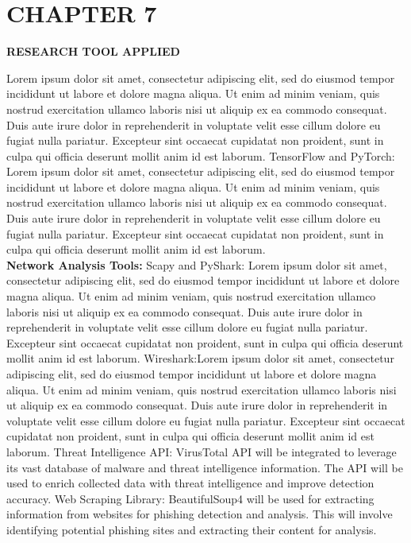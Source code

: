 \documentclass[12pt]{article}
\newcommand{\centersection}[1]{%
  \begin{center}
    \fontfamily{ptm}\fontsize{14}{16}\selectfont\bfseries\uppercase{#1}
  \end{center}
}
\begin{document}
\section*{CHAPTER 7}
\centersection{RESEARCH TOOL APPLIED}
\fontsize{12}{14}\selectfont
Lorem ipsum dolor sit amet, consectetur adipiscing elit, sed do eiusmod tempor incididunt ut labore et dolore magna aliqua. Ut enim ad minim veniam, quis nostrud exercitation ullamco laboris nisi ut aliquip ex ea commodo consequat. Duis aute irure dolor in reprehenderit in voluptate velit esse cillum dolore eu fugiat nulla pariatur. Excepteur sint occaecat cupidatat non proident, sunt in culpa qui officia deserunt mollit anim id est laborum.
TensorFlow and PyTorch: Lorem ipsum dolor sit amet, consectetur adipiscing elit, sed do eiusmod tempor incididunt ut labore et dolore magna aliqua. Ut enim ad minim veniam, quis nostrud exercitation ullamco laboris nisi ut aliquip ex ea commodo consequat. Duis aute irure dolor in reprehenderit in voluptate velit esse cillum dolore eu fugiat nulla pariatur. Excepteur sint occaecat cupidatat non proident, sunt in culpa qui officia deserunt mollit anim id est laborum.\\
\textbf{Network Analysis Tools:}
Scapy and PyShark: Lorem ipsum dolor sit amet, consectetur adipiscing elit, sed do eiusmod tempor incididunt ut labore et dolore magna aliqua. Ut enim ad minim veniam, quis nostrud exercitation ullamco laboris nisi ut aliquip ex ea commodo consequat. Duis aute irure dolor in reprehenderit in voluptate velit esse cillum dolore eu fugiat nulla pariatur. Excepteur sint occaecat cupidatat non proident, sunt in culpa qui officia deserunt mollit anim id est laborum.
Wireshark:Lorem ipsum dolor sit amet, consectetur adipiscing elit, sed do eiusmod tempor incididunt ut labore et dolore magna aliqua. Ut enim ad minim veniam, quis nostrud exercitation ullamco laboris nisi ut aliquip ex ea commodo consequat. Duis aute irure dolor in reprehenderit in voluptate velit esse cillum dolore eu fugiat nulla pariatur. Excepteur sint occaecat cupidatat non proident, sunt in culpa qui officia deserunt mollit anim id est laborum.
Threat Intelligence API: VirusTotal API will be integrated to leverage its vast database of malware and threat intelligence information. The API will be used to enrich collected data with threat intelligence and improve detection accuracy.
Web Scraping Library: BeautifulSoup4 will be used for extracting information from websites for phishing detection and analysis. This will involve identifying potential phishing sites and extracting their content for analysis.
\end{document}
